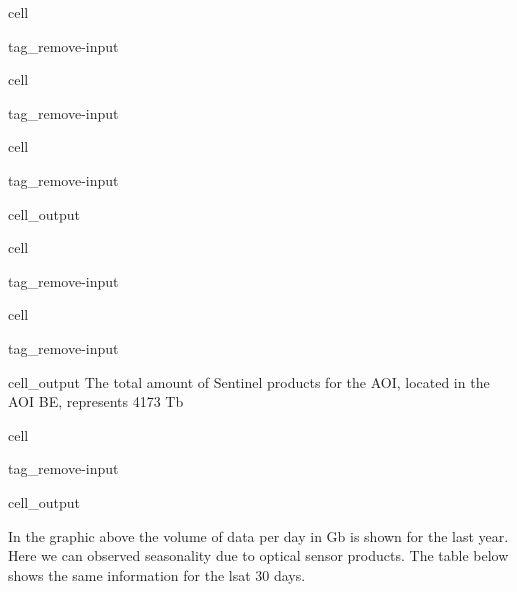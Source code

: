 \documentclass[letterpaper,10pt,english]{jupyterBook}
\begin{document}
\begin{sphinxuseclass}{cell}
\begin{sphinxuseclass}{tag_remove-input}
\end{sphinxuseclass}
\end{sphinxuseclass}
\begin{sphinxuseclass}{cell}
\begin{sphinxuseclass}{tag_remove-input}
\end{sphinxuseclass}
\end{sphinxuseclass}
\begin{sphinxuseclass}{cell}
\begin{sphinxuseclass}{tag_remove-input}\begin{sphinxVerbatimOutput}

\begin{sphinxuseclass}{cell_output}
\end{sphinxuseclass}\end{sphinxVerbatimOutput}

\end{sphinxuseclass}
\end{sphinxuseclass}
\begin{sphinxuseclass}{cell}
\begin{sphinxuseclass}{tag_remove-input}
\end{sphinxuseclass}
\end{sphinxuseclass}
\begin{sphinxuseclass}{cell}
\begin{sphinxuseclass}{tag_remove-input}\begin{sphinxVerbatimOutput}

\begin{sphinxuseclass}{cell_output}
\sphinxAtStartPar
The total amount of Sentinel products for the AOI, located in the AOI BE, represents 4173 Tb

\end{sphinxuseclass}\end{sphinxVerbatimOutput}

\end{sphinxuseclass}
\end{sphinxuseclass}
\begin{sphinxuseclass}{cell}
\begin{sphinxuseclass}{tag_remove-input}\begin{sphinxVerbatimOutput}

\begin{sphinxuseclass}{cell_output}
\noindent{}

\end{sphinxuseclass}\end{sphinxVerbatimOutput}

\end{sphinxuseclass}
\end{sphinxuseclass}
\sphinxAtStartPar
In the graphic above the volume of data per day in Gb is shown for the last year. Here we can observed seasonality due to optical sensor products. The table below shows the same information for the lsat 30 days.
\end{document}
